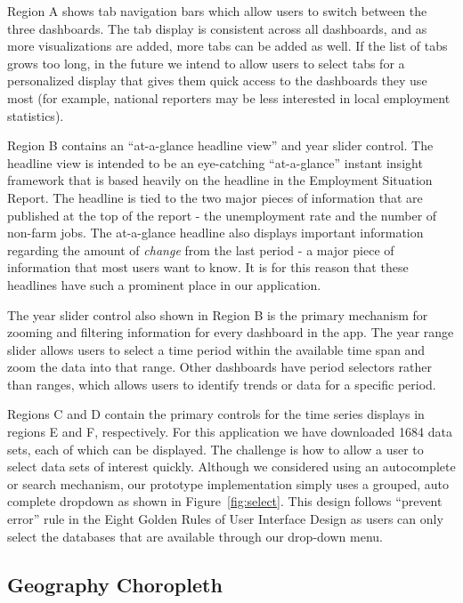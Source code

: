 \documentclass[11pt,letterpaper]{article}
\begin{document}
Region A shows tab navigation bars which allow users to switch between the three dashboards. The tab display is consistent across all dashboards, and as more visualizations are added, more tabs can be added as well. If the list of tabs grows too long, in the future we intend to allow users to select tabs for a personalized display that gives them quick access to the dashboards they use most (for example, national reporters may be less interested in local employment statistics).

Region B contains an ``at-a-glance headline view'' and year slider control. The headline view is intended to be an eye-catching ``at-a-glance'' instant insight framework that is based heavily on the headline in the Employment Situation Report. The headline is tied to the two major pieces of information that are published at the top of the report - the unemployment rate and the number of non-farm jobs. The at-a-glance headline also displays important information regarding the amount of \textit{change} from the last period - a major piece of information that most users want to know. It is for this reason that these headlines have such a prominent place in our application.

The year slider control also shown in Region B is the primary mechanism for zooming and filtering information for every dashboard in the app. The year range slider allows users to select a time period within the available time span and zoom the data into that range. Other dashboards have period selectors rather than ranges, which allows users to identify trends or data for a specific period.

Regions C and D contain the primary controls for the time series displays in regions E and F, respectively. For this application we have downloaded 1684 data sets, each of which can be displayed. The challenge is how to allow a user to select data sets of interest quickly. Although we considered using an autocomplete or search mechanism, our prototype implementation simply uses a grouped, auto complete dropdown as shown in Figure~\ref{fig:select}. This design follows ``prevent error'' rule in the Eight Golden Rules of User Interface Design \cite{shneiderman_eight_????} as users can only select the databases that are available through our drop-down menu.

\subsection{Geography Choropleth}
\end{document}
